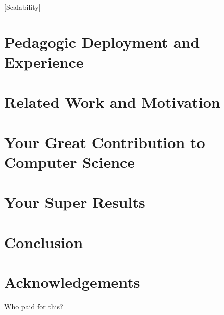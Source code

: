 \documentclass[final,12pt]{elsarticle}
\begin{document}
{[}Scalability]
\section{Pedagogic Deployment and Experience}
\label{sec:orgb50066f}

\section{Related Work and Motivation}
\label{sec:orgb740105}
\label{sec.relatedwork}
\section{Your Great Contribution to Computer Science}
\label{sec:orge1642af}
\label{sec.proposal}
\section{Your Super Results}
\label{sec:orge73f018}
\section{Conclusion}
\label{sec:org9dab3fb}
\section*{Acknowledgements}

Who paid for this?


\end{document}
